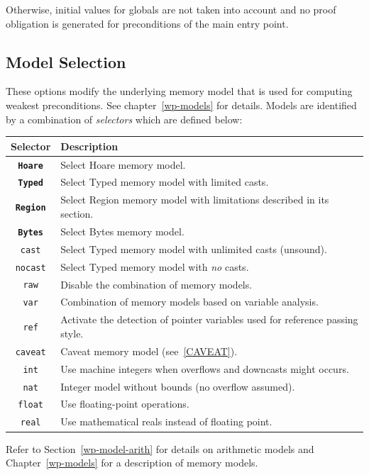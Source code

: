 Otherwise, initial values for globals are not taken into account and
no proof obligation is generated for preconditions of the main entry
point.

\subsection{Model Selection}
These options modify the underlying memory model that is used for
computing weakest preconditions. See chapter~\ref{wp-models} for
details. Models are identified by a combination of \emph{selectors}
which are defined below:
\begin{center}
  \begin{tabular}{cl}
    Selector & Description \\
    \hline
    \texttt{\bf Hoare} & Select Hoare memory model. \\
    \texttt{\bf Typed} & Select Typed memory model with limited casts.\\
    \texttt{\bf Region} & Select Region memory model with limitations described in its section.\\
    \texttt{\bf Bytes} & Select Bytes memory model.\\
    \texttt{cast}  & Select Typed memory model with unlimited casts (unsound). \\
    \texttt{nocast} & Select Typed memory model with \emph{no} casts. \\
    \hline
    \texttt{raw} & Disable the combination of memory models. \\
    \texttt{var} & Combination of memory models based on variable analysis. \\
    \texttt{ref} & Activate the detection of pointer variables used for reference passing style. \\
    \texttt{caveat} & Caveat memory model (see~\ref{CAVEAT}). \\
    \hline
    \texttt{int} & Use machine integers when overflows and downcasts might occurs. \\
    \texttt{nat} & Integer model without bounds (no overflow assumed). \\
    \hline
    \texttt{float} & Use floating-point operations. \\
    \texttt{real} & Use mathematical reals instead of floating point. \\
    \hline
  \end{tabular}
\end{center}

Refer to Section~\ref{wp-model-arith} for details on arithmetic models and
Chapter~\ref{wp-models} for a description of memory models.

